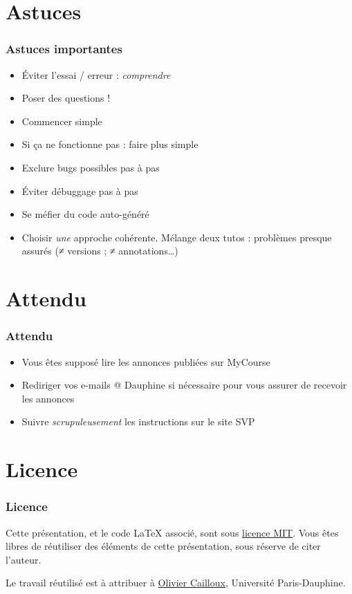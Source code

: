 \documentclass[english, french]{beamer}
\begin{document}
\section{Astuces}
\begin{frame}
	\frametitle{Astuces importantes}
	\begin{itemize}
		\item Éviter l’essai / erreur : \emph{comprendre}
		\item Poser des questions !
		\item Commencer simple
		\item Si ça ne fonctionne pas : faire plus simple
		\item Exclure bugs possibles pas à pas
		\item Éviter débuggage pas à pas
		\item Se méfier du code auto-généré
		\item Choisir \emph{une} approche cohérente. Mélange deux tutos : problèmes presque assurés ({}≠ versions ; ≠ annotations…)
	\end{itemize}
\end{frame}

\section{Attendu}
\begin{frame}
	\frametitle{Attendu}
	\begin{itemize}
		\item Vous êtes supposé lire les annonces publiées sur MyCourse
		\item Rediriger vos e-mails @ Dauphine si nécessaire pour vous assurer de recevoir les annonces
		\item Suivre \emph{scrupuleusement} les instructions sur le site SVP
	\end{itemize}
\end{frame}

\appendix
\section{Licence}
\begin{frame}
	\frametitle{Licence}
	Cette présentation, et le code LaTeX associé, sont sous \href{https://opensource.org/licenses/MIT}{licence MIT}. Vous êtes libres de réutiliser des éléments de cette présentation, sous réserve de citer l’auteur.
	
	Le travail réutilisé est à attribuer à \href{http://www.lamsade.dauphine.fr/~ocailloux/}{Olivier Cailloux}, Université Paris-Dauphine.
\end{frame}
\end{document}
